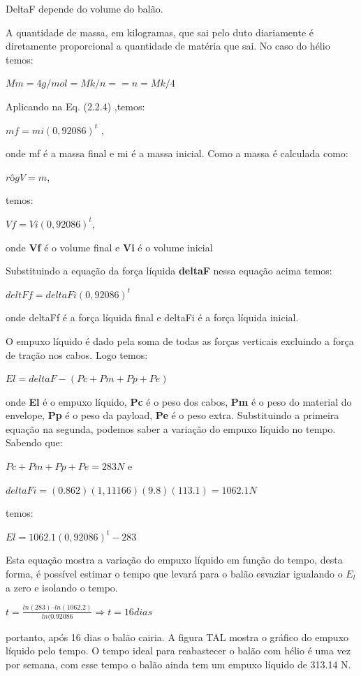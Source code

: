 	DeltaF depende do volume do balão.
	 
	 A quantidade de massa, em kilogramas, que sai pelo duto diariamente é diretamente proporcional a quantidade de matéria que sai. No caso do hélio temos:

		 $Mm = 4g/mol = Mk/n   == n = Mk/4$

	Aplicando na Eq. (2.2.4) ,temos:
	
	$mf = mi (0,92086)^t$ ,
	
	 onde mf é a massa final e mi é a massa inicial.
	Como a massa é calculada como:

	$rô g V = m$,

	temos:
	
	$Vf = Vi (0,92086)^t$,

	 onde \textbf{Vf} é o volume final e \textbf{Vi} é o volume inicial

	Substituindo a equação da força líquida \textbf{deltaF} nessa equação acima temos:


	$deltFf = deltaFi(0,92086)^t$
	
	onde deltaFf é a força líquida final e deltaFi é a força líquida inicial.
	 
	 O empuxo líquido é dado pela soma de todas as forças verticais excluindo a força de tração nos cabos. Logo temos:

	$El = deltaF - ( Pc + Pm + Pp+Pe)$
	
	onde \textbf{El} é o empuxo líquido, \textbf{Pc} é o peso dos cabos, \textbf{Pm} é o peso do material do envelope, \textbf{Pp} é o peso da payload, \textbf{Pe} é o peso extra. 
	Substituindo a primeira equação na segunda, podemos saber a variação do empuxo líquido no tempo. Sabendo que:

	 $Pc + Pm + Pp+Pe = 283 N$   e

	 $deltaFi = (0.862)(1,11166)(9.8)(113.1) = 1062.1 N$

	temos:

	 $El = 1062.1(0,92086)^t - 283$

	Esta equação mostra a variação do empuxo líquido em função do tempo, desta forma, é possível estimar o tempo que levará para o balão esvaziar igualando o $E_l$ a zero e isolando o tempo.

	$t = \frac{ln(283) – ln(1062.2)}{ln(0.92086} \Rightarrow t = 16 dias$

	portanto, após 16 dias o balão cairia. A figura TAL mostra o gráfico do empuxo líquido pelo tempo. O tempo ideal para reabastecer o balão com hélio é uma vez por semana, com esse tempo o balão ainda tem um empuxo líquido de 313.14 N.
	
